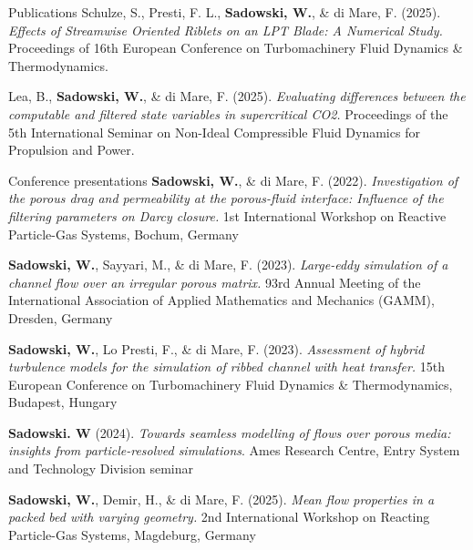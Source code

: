 \documentclass[a4paper, 10pt]{article}
\def \parspace {0.5em}
\begin{document}
{\begin{cvsection}{Publications}
		\vspace{0.5em}
		Schulze, S., Presti, F. L., \textbf{Sadowski, W.}, \& di Mare, F. (2025).
		\textit{Effects of Streamwise Oriented Riblets on an LPT Blade: A Numerical Study.}
		Proceedings of 16th European Conference on Turbomachinery Fluid Dynamics \& Thermodynamics. 

		\vspace{0.5em}
		Lea, B., \textbf{Sadowski, W.}, \& di Mare, F. (2025).
		\textit{Evaluating differences between the computable and ﬁltered state variables in supercritical CO2.}
		Proceedings of the 5th International Seminar on Non-Ideal Compressible Fluid Dynamics for Propulsion and Power. \par
		\vspace{\parspace}

	\end{cvsection}
	\begin{cvsection}{Conference presentations}
		\textbf{Sadowski, W.}, \& di Mare, F. (2022).
		\textit{Investigation of the porous drag and permeability at the porous-fluid interface: Influence of the filtering parameters on Darcy closure.}
		1st International Workshop on Reactive Particle-Gas Systems, Bochum, Germany

		\vspace{0.5em}
		\textbf{Sadowski, W.}, Sayyari, M., \& di Mare, F. (2023).
		\textit{Large-eddy simulation of a channel flow over an irregular porous matrix.}
		93rd Annual Meeting of the International Association of Applied Mathematics and Mechanics (GAMM), Dresden, Germany

		\vspace{0.5em}
		\textbf{Sadowski, W.}, Lo Presti, F., \& di Mare, F. (2023).
		\textit{Assessment of hybrid turbulence models for the simulation of ribbed channel with heat transfer.}
		15th European Conference on Turbomachinery Fluid Dynamics \& Thermodynamics, Budapest, Hungary

		\vspace{0.5em}
		\textbf{Sadowski. W} (2024).
		\textit{Towards seamless modelling of flows over porous media: insights from particle-resolved simulations}.
		Ames Research Centre, Entry System and Technology Division seminar

		\vspace{0.5em}
		\textbf{Sadowski, W.}, Demir, H., \& di Mare, F. (2025).
		\textit{Mean flow properties in a packed bed with varying  geometry.}
		2nd International Workshop on Reacting Particle-Gas Systems, Magdeburg, Germany


\end{cvsection}}
\end{document}
